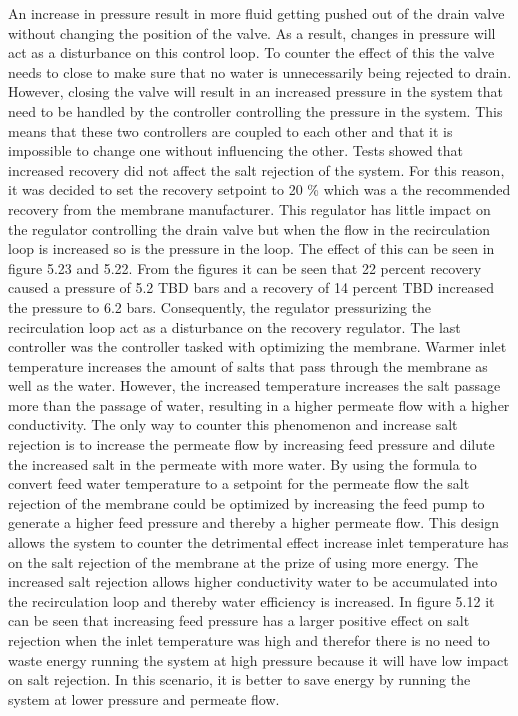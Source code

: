 An increase in pressure result in more fluid getting pushed out of the drain valve without changing the position of the valve. As a result, changes in pressure will act as a disturbance on this control loop. To counter the effect of this the valve needs to close to make sure that no water is unnecessarily being rejected to drain. However, closing the valve will result in an increased pressure in the system that need to be handled by the controller controlling the pressure in the system. This means that these two controllers are coupled to each other and that it is impossible to change one without influencing the other. 
Tests showed that increased recovery did not affect the salt rejection of the system. For this reason, it was decided to set the recovery setpoint to 20 \% which was a the recommended recovery from the membrane manufacturer. This regulator has little impact on the regulator controlling the drain valve but when the flow in the recirculation loop is increased so is the pressure in the loop. The effect of this can be seen in figure 5.23 and 5.22. From the figures it can be seen that 22 percent recovery caused a pressure of 5.2 TBD bars and a recovery of 14 percent TBD increased the pressure to 6.2 bars. Consequently, the regulator pressurizing the recirculation loop act as a disturbance on the recovery regulator.
The last controller was the controller tasked with optimizing the membrane. Warmer inlet temperature increases the amount of salts that pass through the membrane as well as the water. However, the increased temperature increases the salt passage more than the passage of water, resulting in a higher permeate flow with a higher conductivity. The only way to counter this phenomenon and increase salt rejection is to increase the permeate flow by increasing feed pressure and dilute the increased salt in the permeate with more water. By using the formula to convert feed water temperature to a setpoint for the permeate flow the salt rejection of the membrane could be optimized by increasing the feed pump to generate a higher feed pressure and thereby a higher permeate flow. This design allows the system to counter the detrimental effect increase inlet temperature has on the salt rejection of the membrane at the prize of using more energy. The increased salt rejection allows higher conductivity water to be accumulated into the recirculation loop and thereby water efficiency is increased. In figure 5.12 it can be seen that increasing feed pressure has a larger positive effect on salt rejection when the inlet temperature was high and therefor there is no need to waste energy running the system at high pressure because it will have low impact on salt rejection. In this scenario, it is better to save energy by running the system at lower pressure and permeate flow. 

